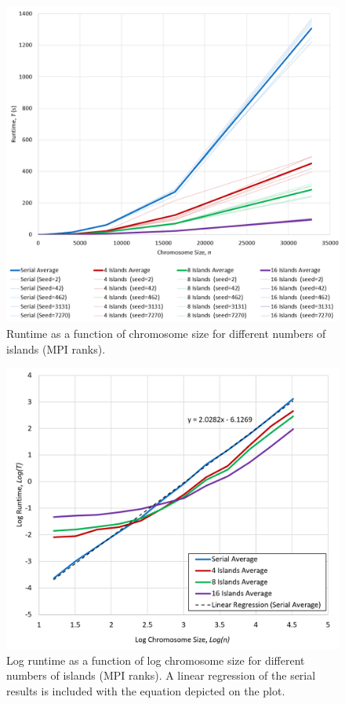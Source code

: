 \documentclass{report}
\begin{document}
\begin{figure}[h]
\centering
\includegraphics[scale=0.4]{runtime_perf}
\caption{Runtime as a function of chromosome size for different numbers of islands (MPI ranks).}\label{runtimeperf}
\end{figure}
\begin{figure}[H]
\centering
\includegraphics[scale=0.385]{logruntime_perf}
\caption{Log runtime as a function of log chromosome size for different numbers of islands (MPI ranks). A linear regression of the serial results is included with the equation depicted on the plot. }\label{logruntimeperf}
\end{figure}
\end{document}
